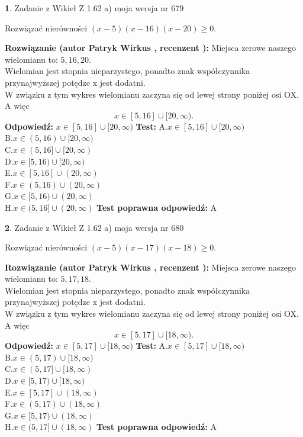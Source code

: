 \documentclass[12pt, a4paper]{article}
\theoremstyle{definition} %
\newtheorem{zad}{}
\newcommand{\zadStart}[1]{\begin{zad}#1\newline}
\newcommand{\zadStop}{\end{zad}}
\newcommand{\rozwStart}[2]{\noindent \textbf{Rozwiązanie (autor #1 , recenzent #2): }\newline}
\newcommand{\rozwStop}{\newline}
\newcommand{\odpStart}{\noindent \textbf{Odpowiedź:}\newline}
\newcommand{\odpStop}{\newline}
\newcommand{\testStart}{\noindent \textbf{Test:}\newline}
\newcommand{\testStop}{\newline}
\newcommand{\kluczStart}{\noindent \textbf{Test poprawna odpowiedź:}\newline}
\newcommand{\kluczStop}{\newline}
\begin{document}
\zadStart{Zadanie z Wikieł Z 1.62 a) moja wersja nr 679}

Rozwiązać nierówności $(x-5)(x-16)(x-20)\ge0$.
\zadStop
\rozwStart{Patryk Wirkus}{}
Miejsca zerowe naszego wielomianu to: $5, 16, 20$.\\
Wielomian jest stopnia nieparzystego, ponadto znak współczynnika przy\linebreak najwyższej potędze x jest dodatni.\\ W związku z tym wykres wielomianu zaczyna się od lewej strony poniżej osi OX. A więc $$x \in [5,16] \cup [20,\infty).$$
\rozwStop
\odpStart
$x \in [5,16] \cup [20,\infty)$
\odpStop
\testStart
A.$x \in [5,16] \cup [20,\infty)$\\
B.$x \in (5,16) \cup [20,\infty)$\\
C.$x \in (5,16] \cup [20,\infty)$\\
D.$x \in [5,16) \cup [20,\infty)$\\
E.$x \in [5,16] \cup (20,\infty)$\\
F.$x \in (5,16) \cup (20,\infty)$\\
G.$x \in [5,16) \cup (20,\infty)$\\
H.$x \in (5,16] \cup (20,\infty)$
\testStop
\kluczStart
A
\kluczStop



\zadStart{Zadanie z Wikieł Z 1.62 a) moja wersja nr 680}

Rozwiązać nierówności $(x-5)(x-17)(x-18)\ge0$.
\zadStop
\rozwStart{Patryk Wirkus}{}
Miejsca zerowe naszego wielomianu to: $5, 17, 18$.\\
Wielomian jest stopnia nieparzystego, ponadto znak współczynnika przy\linebreak najwyższej potędze x jest dodatni.\\ W związku z tym wykres wielomianu zaczyna się od lewej strony poniżej osi OX. A więc $$x \in [5,17] \cup [18,\infty).$$
\rozwStop
\odpStart
$x \in [5,17] \cup [18,\infty)$
\odpStop
\testStart
A.$x \in [5,17] \cup [18,\infty)$\\
B.$x \in (5,17) \cup [18,\infty)$\\
C.$x \in (5,17] \cup [18,\infty)$\\
D.$x \in [5,17) \cup [18,\infty)$\\
E.$x \in [5,17] \cup (18,\infty)$\\
F.$x \in (5,17) \cup (18,\infty)$\\
G.$x \in [5,17) \cup (18,\infty)$\\
H.$x \in (5,17] \cup (18,\infty)$
\testStop
\kluczStart
A
\kluczStop
\end{document}
